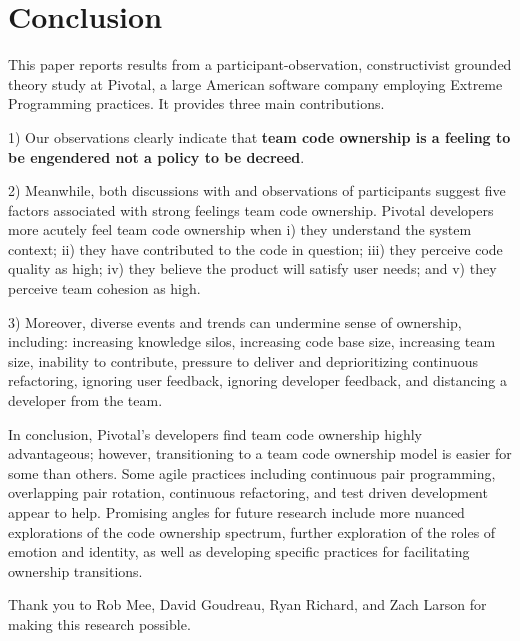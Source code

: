 \section{Conclusion}
\label{Conclusion}
This paper reports results from a participant-observation, constructivist grounded theory study at Pivotal, a large American software company employing Extreme Programming practices. It provides three main contributions.

1) Our observations clearly indicate that \textbf{team code ownership is a feeling to be engendered not a policy to be decreed}.

2) Meanwhile, both discussions with and observations of participants suggest five factors associated with strong feelings team code ownership. Pivotal developers more acutely feel team code ownership when i) they understand the system context; ii) they have contributed to the code in question; iii) they perceive code quality as high; iv) they believe the product will satisfy user needs; and v) they perceive team cohesion as high.   

3) Moreover, diverse events and trends can undermine sense of ownership, including:  increasing knowledge silos, increasing code base size, increasing team size, inability to contribute, pressure to deliver and deprioritizing continuous refactoring, ignoring user feedback, ignoring developer feedback, and distancing a developer from the team. 

In conclusion, Pivotal's developers find team code ownership highly advantageous; however, transitioning to a team code ownership model is easier for some than others. Some agile practices including continuous pair programming, overlapping pair rotation, continuous refactoring, and test driven development appear to help. Promising angles for future research include more nuanced explorations of the code ownership spectrum, further exploration of the roles of emotion and identity, as well as developing specific practices for facilitating ownership transitions. 

Thank you to Rob Mee, David Goudreau, Ryan Richard, and Zach Larson for making this research possible.
